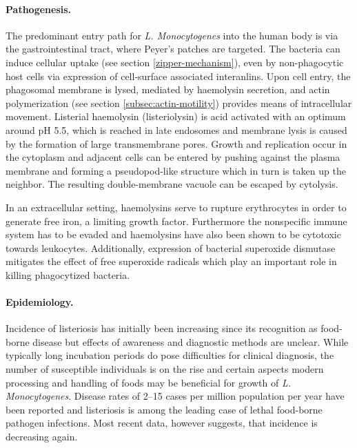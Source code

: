 \paragraph{Pathogenesis.}
The predominant entry path for \textit{L. Monocytogenes} into the human body is via the gastrointestinal tract, where Peyer's patches are targeted. The bacteria can induce cellular uptake (see section \ref{zipper-mechanism}), even by non-phagocytic host cells via expression of cell-surface associated interanlins. Upon cell entry, the phagosomal membrane is lysed, mediated by haemolysin secretion, and actin polymerization (see section \ref{subsec:actin-motility}) provides means of intracellular movement. Listerial haemolysin (listeriolysin) is acid activated with an optimum around pH 5.5, which is reached in late endosomes and membrane lysis is caused by the formation of large transmembrane pores. Growth and replication occur in the cytoplasm and adjacent cells can be entered by pushing against the plasma membrane and forming a pseudopod-like structure which in turn is taken up the neighbor. The resulting double-membrane vacuole can be escaped by cytolysis.

In an extracellular setting, haemolysins serve to rupture erythrocytes in order to generate free iron, a limiting growth factor. Furthermore the nonspecific immune system has to be evaded and haemolysins have also been shown to be cytotoxic towards leukocytes. Additionally, expression of bacterial superoxide dismutase mitigates the effect of free superoxide radicals which play an important role in killing phagocytized bacteria.

\paragraph{Epidemiology.}
Incidence of listeriosis has initially been increasing since its recognition as food-borne disease but effects of awareness and diagnostic methods are unclear. While typically long incubation periods do pose difficulties for clinical diagnosis, the number of susceptible individuals is on the rise and certain aspects modern processing and handling of foods may be beneficial for growth of \textit{L. Monocytogenes}. Disease rates of 2--15 cases per million population per year have been reported and listeriosis is among the leading case of lethal food-borne pathogen infections. Most recent data, however suggests, that incidence is decreasing again.

